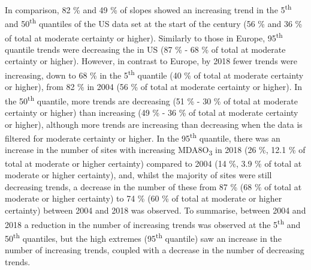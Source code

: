 \documentclass[journal abbreviation, manuscript]{copernicus}
\begin{document}
In comparison, 82 \%  and 49 \% of slopes showed an increasing trend in the 5\textsuperscript{th} and 50\textsuperscript{th} quantiles of the US data set at the start of the century (56 \% and 36 \% of total at moderate certainty or higher). Similarly to those in Europe, 95\textsuperscript{th} quantile trends were decreasing the in US (87 \% - 68 \% of total at moderate certainty or higher). However, in contrast to Europe, by 2018 fewer trends were increasing, down to 68 \% in the 5\textsuperscript{th} quantile (40 \% of total at moderate certainty or higher), from 82 \% in 2004 (56 \% of total at moderate certainty or higher). In the 50\textsuperscript{th} quantile, more trends are decreasing (51 \% - 30 \% of total at moderate certainty or higher) than increasing (49 \% - 36 \% of total at moderate certainty or higher), although more trends are increasing than decreasing when the data is filtered for moderate certainty or higher. In the 95\textsuperscript{th} quantile, there was an increase in the number of sites with increasing MDA8O\textsubscript{3} in 2018 (26 \%, 12.1 \% of total at moderate or higher certainty) compared to 2004 (14 \%, 3.9 \% of total at moderate or higher certainty), and, whilst the majority of sites were still decreasing trends, a decrease in the number of these from 87 \% (68 \% of total at moderate or higher certainty) to 74 \% (60 \% of total at moderate or higher certainty) between 2004 and 2018 was observed. To summarise, between 2004 and 2018 a reduction in the number of increasing trends was observed at the 5\textsuperscript{th} and 50\textsuperscript{th} quantiles, but the high extremes (95\textsuperscript{th} quantile) saw an increase in the number of increasing trends, coupled with a decrease in the number of decreasing trends.
\end{document}
